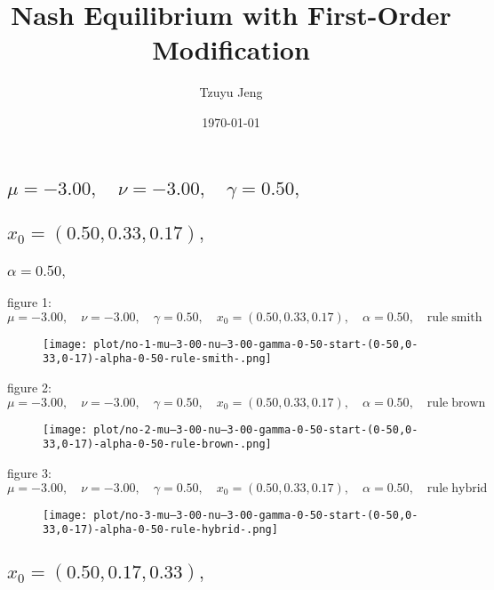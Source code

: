 \documentclass[a4paper]{article}
\title{
      Nash Equilibrium with First-Order Modification
   }
\author{Tzuyu Jeng}
\date{\today}
\begin{document}
      \maketitle
      \begin{multicols*}{2}
   

   \section{\(\mu = -3.00,\quad \nu = -3.00,\quad \gamma = 0.50,\quad \)}
   

   \subsection{\(x_0 = (0.50,0.33,0.17),\quad \)}
   

   \subsubsection{\(\alpha = 0.50,\quad \)}
   
figure 1: \(\mu = -3.00,\quad \nu = -3.00,\quad \gamma = 0.50,\quad x_0 = (0.50,0.33,0.17),\quad \alpha = 0.50,\quad \mathrm{rule} \; \mathrm{smith}\)
   \begin{figure}[H]
   \centering
   \texttt{[image: plot/no-1-mu--3-00-nu--3-00-gamma-0-50-start-(0-50,0-33,0-17)-alpha-0-50-rule-smith-.png]}
   \end{figure}
   
figure 2: \(\mu = -3.00,\quad \nu = -3.00,\quad \gamma = 0.50,\quad x_0 = (0.50,0.33,0.17),\quad \alpha = 0.50,\quad \mathrm{rule} \; \mathrm{brown}\)
   \begin{figure}[H]
   \centering
   \texttt{[image: plot/no-2-mu--3-00-nu--3-00-gamma-0-50-start-(0-50,0-33,0-17)-alpha-0-50-rule-brown-.png]}
   \end{figure}
   
figure 3: \(\mu = -3.00,\quad \nu = -3.00,\quad \gamma = 0.50,\quad x_0 = (0.50,0.33,0.17),\quad \alpha = 0.50,\quad \mathrm{rule} \; \mathrm{hybrid}\)
   \begin{figure}[H]
   \centering
   \texttt{[image: plot/no-3-mu--3-00-nu--3-00-gamma-0-50-start-(0-50,0-33,0-17)-alpha-0-50-rule-hybrid-.png]}
   \end{figure}
   

   \subsection{\(x_0 = (0.50,0.17,0.33),\quad \)}
   


\end{multicols*}
\end{document}
